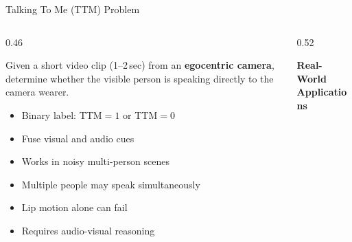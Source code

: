 \documentclass[aspectratio=169, 10pt]{beamer}
\begin{document}
\begin{frame}{Talking To Me (TTM) Problem}
\small

\begin{columns}[T,onlytextwidth]

\begin{column}{0.46\textwidth}

\begin{tcolorbox}[
bluecard,
title={\small Formal Task Definition},
boxsep=2pt,
left=3pt,right=3pt,
top=3pt,bottom=3pt]

Given a short video clip (1--2\,sec) from an \textbf{egocentric camera}, determine whether the visible person is speaking directly to the camera wearer.

\vspace{2pt}

\begin{itemize}[leftmargin=*, itemsep=1pt]
\item[\textcolor{AccBlue}{$\blacktriangleright$}] Binary label: TTM$=1$ or TTM$=0$
\item[\textcolor{AccBlue}{$\blacktriangleright$}] Fuse visual and audio cues
\item[\textcolor{AccBlue}{$\blacktriangleright$}] Works in noisy multi-person scenes
\end{itemize}

\end{tcolorbox}

\vspace{3pt}

\begin{tcolorbox}[
orangecard,
title={\small Why not just detect speech?},
boxsep=2pt,
left=3pt,right=3pt,
top=3pt,bottom=3pt]

\begin{itemize}[leftmargin=*, itemsep=1pt]
\item Multiple people may speak simultaneously
\item Lip motion alone can fail
\item Requires audio-visual reasoning
\end{itemize}

\end{tcolorbox}

\end{column}

\begin{column}{0.52\textwidth}

\textcolor{NavyBlue}{\small\bfseries Real-World Applications}


\end{column}
\end{columns}
\end{frame}
\end{document}
